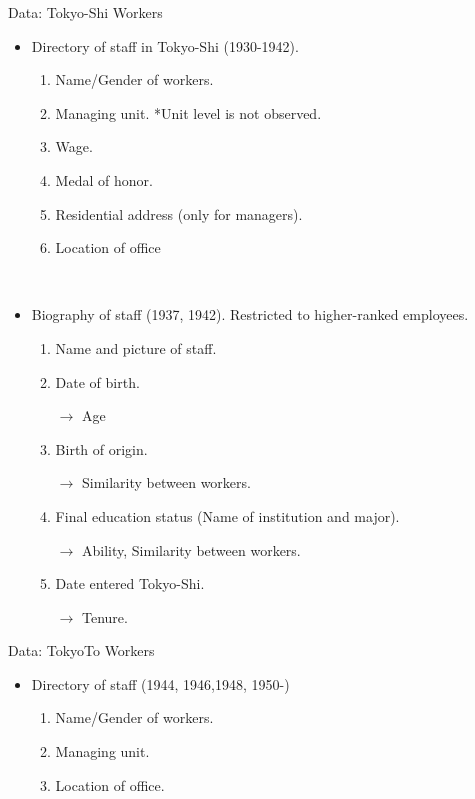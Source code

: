 \begin{frame}{Data: Tokyo-Shi Workers}
\begin{itemize}
    \item Directory of staff in Tokyo-Shi (1930-1942).
        \begin{enumerate}
            \item Name/Gender of workers.
            \item Managing unit.
            *Unit level is not observed.
            
            \item Wage.
            \item Medal of honor.
            \item Residential address (only for managers).
            \item Location of office
            
        \end{enumerate}

    \

    \item Biography of staff (1937, 1942).
        Restricted to higher-ranked employees.
        \begin{enumerate}
            \item Name and picture of staff.
            \item Date of birth.
            
            $\rightarrow$\color{red} Age \color{black}
            
            \item Birth of origin.
            
            $\rightarrow$\color{red} Similarity between workers.\color{black}

            \item Final education status (Name of institution and major).
            
            $\rightarrow$\color{red} Ability, Similarity between workers. \color{black}
            \item Date entered Tokyo-Shi.
            
            $\rightarrow$\color{red} Tenure. \color{black}
            
        \end{enumerate}
\end{itemize}
\end{frame}

\begin{frame}{Data: TokyoTo Workers}
\begin{itemize}
    \item Directory of staff (1944, 1946,1948, 1950-)
    \begin{enumerate}
        \item Name/Gender of workers.

        \item Managing unit.

        \item Location of office.
    \end{enumerate}
\end{itemize}
\end{frame}

